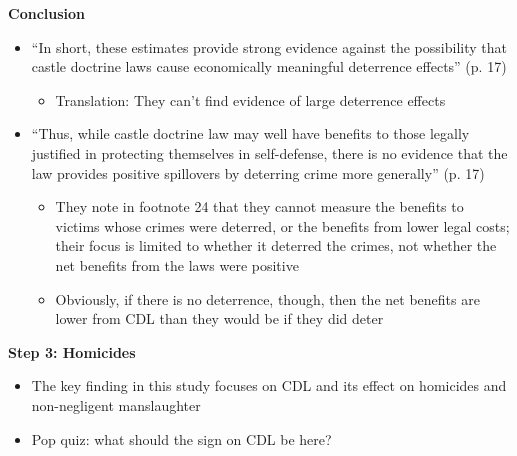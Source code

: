 \documentclass[notes=show]{beamer}
\begin{document}
\begin{frame}[plain]
	\begin{center}
	\textbf{Conclusion}
	\end{center}
	
	\begin{itemize}
	\item ``In short, these estimates provide strong evidence against the possibility that castle doctrine laws cause economically meaningful deterrence effects'' (p. 17)
		\begin{itemize}
		\item Translation: They can't find evidence of large deterrence effects
		\end{itemize}
	\item ``Thus, while castle doctrine law may well have benefits to those legally justified in protecting themselves in self-defense, there is no evidence that the law provides positive spillovers by deterring crime more generally'' (p. 17)
		\begin{itemize}
		\item They note in footnote 24 that they cannot measure the benefits to victims whose crimes were deterred, or the benefits from lower legal costs; their focus is limited to whether it deterred the crimes, not whether the net benefits from the laws were positive
		\item Obviously, if there is no deterrence, though, then the net benefits are lower from CDL than they would be if they did deter
		\end{itemize}
	\end{itemize}
\end{frame}

\begin{frame}[plain]
	\begin{center}
	\textbf{Step 3: Homicides}
	\end{center}
	
	\begin{itemize}
	\item The key finding in this study focuses on CDL and its effect on homicides and non-negligent manslaughter
	\item Pop quiz: what should the sign on CDL be here?
	\end{itemize}
\end{frame}
\end{document}
